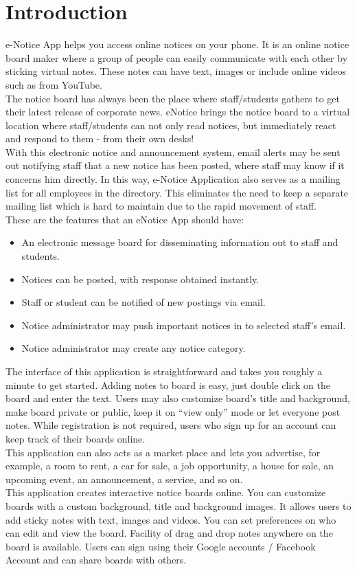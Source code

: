 \section{Introduction}
e-Notice App helps you access online notices on your phone. It is an online notice board maker
where a group of people can easily communicate with each other by sticking virtual notes. These
notes can have text, images or include online videos such as from YouTube.\\
The notice board has always been the place where staff/students gathers to get their latest release
of corporate news. eNotice brings the notice board to a virtual location where staff/students can
not only read notices, but immediately react and respond to them - from their own desks!\\
With this electronic notice and announcement system, email alerts may be sent out notifying
staff that a new notice has been posted, where staff may know if it concerns him directly. In this
way, e-Notice Application also serves as a mailing list for all employees in the directory. This eliminates the
need to keep a separate mailing list which is hard to maintain due to the rapid movement of staff.\\
These are the features that an eNotice App should have:
\begin{itemize}
\item An electronic message board for disseminating information out to staff and students.
\item Notices can be posted, with response obtained instantly.
\item Staff or student can be notified of new postings via email.
\item Notice administrator may push important notices in to selected staff's email.
\item Notice administrator may create any notice category.
\end{itemize}
The interface of this application is straightforward and takes you roughly a minute to get started.
Adding notes to board is easy, just double click on the board and enter the text. Users may also
customize board’s title and background, make board private or public, keep it on “view only”
mode or let everyone post notes.
While registration is not required, users who sign up for an account can keep track of their
boards online. \\
This application can also acts as a market place and lets you advertise, for example, a room to
rent, a car for sale, a job opportunity, a house for sale, an upcoming event, an announcement, a
service, and so on. \\
This application creates interactive notice boards online. You can customize boards with a
custom background, title and background images. It allows users to add sticky notes with text,
images and videos. You can set preferences on who can edit and view the board. Facility of drag
and drop notes anywhere on the board is available. Users can sign using their Google accounts /
Facebook Account and can share boards with others.
